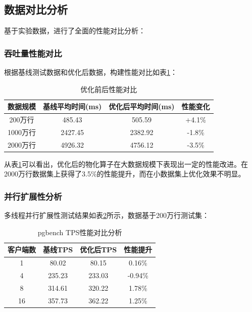 \subsection{数据对比分析}

基于实验数据，进行了全面的性能对比分析：

\subsubsection{吞吐量性能对比}

根据基线测试数据和优化后数据，构建性能对比如表\ref{tab:throughput_comparison}：

\begin{table}[htbp]
\centering
\caption{优化前后性能对比}
\label{tab:throughput_comparison}
\begin{tabular}{|c|c|c|c|}
\hline
数据规模 & 基线平均时间(ms) & 优化后平均时间(ms) & 性能变化 \\
\hline
200万行 & 485.43 & 505.59 & +4.1\% \\
1000万行 & 2427.45 & 2382.92 & -1.8\% \\
2000万行 & 4926.32 & 4756.12 & -3.5\% \\
\hline
\end{tabular}
\end{table}

从表\ref{tab:throughput_comparison}可以看出，优化后的物化算子在大数据规模下表现出一定的性能改进。在2000万行数据集上获得了3.5\%的性能提升，而在小数据集上优化效果不明显。

\subsubsection{并行扩展性分析}

多线程并行扩展性测试结果如表\ref{tab:parallel_scalability}所示，数据基于200万行测试集：

\begin{table}[htbp]
\centering
\caption{pgbench TPS性能对比分析}
\label{tab:parallel_scalability}
\begin{tabular}{|c|c|c|c|}
\hline
客户端数 & 基线TPS & 优化后TPS & 性能提升 \\
\hline
1 & 80.02 & 80.15 & 0.16\% \\
4 & 235.23 & 233.03 & -0.94\% \\
8 & 314.61 & 320.22 & 1.78\% \\
16 & 357.73 & 362.22 & 1.25\% \\
\hline
\end{tabular}
\end{table}

